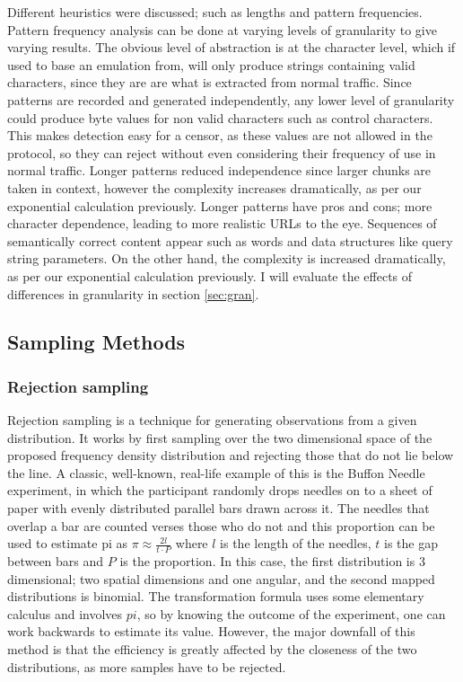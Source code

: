 \documentclass[ %
                    author={Samuel Russell},
                supervisor={Prof. Bogdan Warinschi},
                    degree={MEng},
                     title={Innocuous Ciphertexts},
                  subtitle={The DE-CENSOR Scheme},
                      type={research},
                      year={2018} ]{dissertation}
\begin{document}
Different heuristics were discussed; such as lengths and pattern frequencies.
Pattern frequency analysis can be done at varying levels of granularity to give varying results.
The obvious level of abstraction is at the character level, which if used to base an emulation from, will only produce strings containing valid characters, since they are are what is extracted from normal traffic.
Since patterns are recorded and generated independently, any lower level of granularity could produce byte values for non valid characters such as control characters.
This makes detection easy for a censor, as these values are not allowed in the protocol, so they can reject without even considering their frequency of use in normal traffic.
Longer patterns reduced independence since larger chunks are taken in context, however the complexity increases dramatically, as per our exponential calculation previously.
Longer patterns have pros and cons; more character dependence, leading to more realistic URLs to the eye. Sequences of semantically correct content appear such as words and data structures like query string parameters. On the other hand, the complexity is increased dramatically, as per our exponential calculation previously.
I will evaluate the effects of differences in granularity in section \ref{sec:gran}.


\subsection{Sampling Methods}

\subsubsection{Rejection sampling}

Rejection sampling is a technique for generating observations from a given distribution. 
It works by first sampling over the two dimensional space of the proposed frequency density distribution and rejecting those that do not lie below the line.
A classic, well-known, real-life example of this is the Buffon Needle experiment, in which the participant randomly drops needles on to a sheet of paper with evenly distributed parallel bars drawn across it.
The needles that overlap a bar are counted verses those who do not and this proportion can be used to estimate pi as $\pi \approx \frac{2l}{t \cdot P}$ where $l$ is the length of the needles, $t$ is the gap between bars and $P$ is the proportion.
In this case, the first distribution is 3 dimensional; two spatial dimensions and one angular, and the second mapped distributions is binomial.
The transformation formula uses some elementary calculus and involves $pi$, so by knowing the outcome of the experiment, one can work backwards to estimate its value.
However, the major downfall of this method is that the efficiency is greatly affected by the closeness of the two distributions, as more samples have to be rejected.
\end{document}
